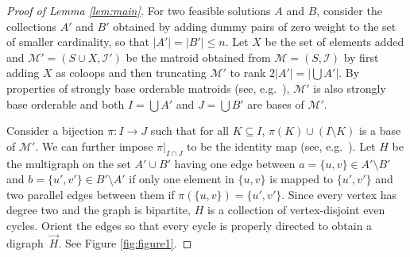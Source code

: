 \documentclass[letterpaper,11pt]{article}
\newcommand{\M}{\mathcal{M}}
\newcommand{\I}{\mathcal{I}}
\theoremstyle{definition}
\begin{document}
\begin{proof}[Proof of Lemma \ref{lem:main}]
For two feasible solutions $A$ and $B$, consider the collections $A'$ and $B'$ obtained by adding dummy pairs of zero weight to the set of smaller cardinality, so that $|A'|=|B'|\leq n$. Let $X$ be the set of elements added and $\M'=(S\cup X,\I')$ be the matroid obtained from $\M=(S,\I)$ by first adding $X$ as coloops and then truncating $\M'$ to rank $2|A'|=|\bigcup A'|$. By properties of strongly base orderable matroids (see, e.g.~\cite[Section 42.6c]{Schrijver-book}), $\M'$ is also strongly base orderable and both $I=\bigcup A'$ and $J=\bigcup B'$ are bases of $\M'$.

Consider a bijection $\pi\colon I \to J$ such that for all $K \subseteq I$, $\pi(K) \cup (I\setminus K)$ is a base of $\M'$. We can further impose $\pi|_{I \cap J}$ to be the identity map (see, e.g.~\cite[Section 42.6c]{Schrijver-book}). Let $H$ be the multigraph on the set $A' \cup B'$ having one edge between $a=\{u,v\} \in A'\setminus B'$ and $b=\{u',v'\} \in B'\setminus A'$ if only one element in $\{u,v\}$ is mapped to $\{u',v'\}$ and two parallel edges between them if $\pi(\{u,v\})=\{u',v'\}$. Since every vertex has degree two and the graph is bipartite, $H$ is a collection of vertex-disjoint even cycles. Orient the edges so that every cycle is properly directed to obtain a digraph~$\vec{H}$. See Figure \ref{fig:figure1}.


\end{proof}
\end{document}
